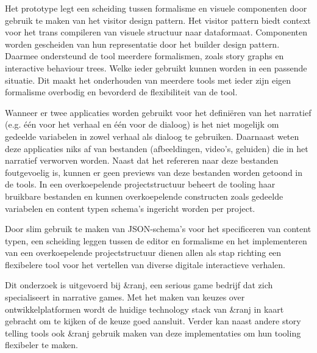 Het prototype legt een scheiding tussen formalisme en visuele componenten door gebruik te maken van het visitor design pattern. Het visitor pattern biedt context voor het trans compileren van visuele structuur naar dataformaat. Componenten worden gescheiden van hun representatie door het builder design pattern. Daarmee ondersteund de tool meerdere formalismen, zoals story graphs en interactive behaviour trees. Welke ieder gebruikt kunnen worden in een passende situatie. Dit maakt het onderhouden van meerdere tools met ieder zijn eigen formalisme overbodig en bevorderd de flexibiliteit van de tool.

Wanneer er twee applicaties worden gebruikt voor het definiëren van het narratief (e.g. één voor het verhaal en één voor de dialoog) is het niet mogelijk om gedeelde variabelen in zowel verhaal als dialoog te gebruiken. Daarnaast weten deze applicaties niks af van bestanden (afbeeldingen, video's, geluiden) die in het narratief verworven worden. Naast dat het refereren naar deze bestanden foutgevoelig is, kunnen er geen previews van deze bestanden worden getoond in de tools. In een overkoepelende projectstructuur beheert de tooling haar bruikbare bestanden en kunnen overkoepelende constructen zoals gedeelde variabelen en content typen schema's ingericht worden per project.


Door slim gebruik te maken van JSON-schema’s voor het specificeren van content typen, een scheiding leggen tussen de editor en formalisme en het implementeren van een overkoepelende projectstructuur dienen allen als stap richting een flexibelere tool voor het vertellen van diverse digitale interactieve verhalen.

Dit onderzoek is uitgevoerd bij \&ranj, een serious game bedrijf dat zich specialiseert in narrative games. Met het maken van keuzes over ontwikkelplatformen wordt de huidige technology stack van \&ranj in kaart gebracht om te kijken of de keuze goed aansluit. Verder kan naast andere story telling tools ook \&ranj gebruik maken van deze implementaties om hun tooling flexibeler te maken.